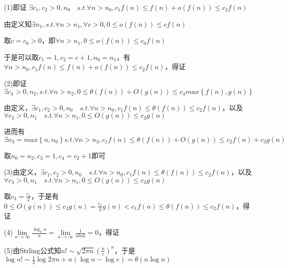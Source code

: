 \documentclass[12pt]{article}
\begin{document}
(1)即证 $\exists c_1, c_2 > 0,n_0 \quad s.t. \forall n > n_0, c_1 f(n) \leq f(n) + o(f(n)) \leq c_2 f(n)$

由定义知$\exists n_1, s.t. \forall n > n_1, \forall c > 0,0 \leq o(f(n)) \leq c f(n)$ 

取$c = c_0 > 0$，即$ \forall n > n_1, 0 \leq o(f(n)) \leq c_0 f(n)$

于是可以取$c_1 = 1, c_2 = c + 1, n_0 = n_1$，有$\forall n > n_0, c_1 f(n) \leq f(n) + o(f(n)) \leq c_2 f(n)$，得证

\vspace{1cm}

(2)即证$\exists c_4 > 0, n_2, s.t.\forall n > n_2,0 \leq \theta(f(n)) + O(g(n)) \leq c_4 max\left \{ f(n),g(n) \right \}$

由定义，$\exists c_1, c_2 > 0,n_0 \quad s.t. \forall n > n_0, c_1 f(n) \leq \theta(f(n))\leq c_2 f(n)$，以及$\forall c_3 > 0,n_1 \quad s.t. \forall n > n_1, 0 \leq O(g(n)) \leq c_3 g(n)$

进而有$\exists n_3 = max \left \{ n,n_0 \right \} s.t. \forall n > n_3, c_1 f(n) \leq \theta (f(n)) + O(g(n)) \leq c_2 f(n) + c_3 g(n)$

取$n_0 = n_2, c_3 = 1, c_4 = c_2 + 1$即可

\vspace{1cm}

(3)由定义，$\exists c_1, c_2 > 0,n_0 \quad s.t. \forall n > n_0, c_1 f(n) \leq \theta(f(n))\leq c_2 f(n)$，以及$\forall c_3 > 0,n_1 \quad s.t. \forall n > n_1, 0 \leq O(g(n)) \leq c_3 g(n)$

取$c_3 = \frac{c_1}{2}$，于是有$0 \leq O(g(n)) \leq c_3 g(n) = \frac{c_1}{2} g(n) < c_1 f(n) \leq \theta(f(n))\leq c_2 f(n)$，得证

\vspace{1cm}

(4)$\lim\limits_{x \to \infty} \frac{\log_k n}{n} = \lim\limits_{x \to \infty} \frac{1}{nlnk} = 0$，得证

\vspace{1cm}

(5)由Strling公式知$n! \sim \sqrt{2\pi n} \left( \frac{n}{e}\right)^n $，于是$\log n! \sim \frac{1}{2} \log{2\pi n} + n(\log n - \log e) = \theta(n \log n)$
\end{document}
